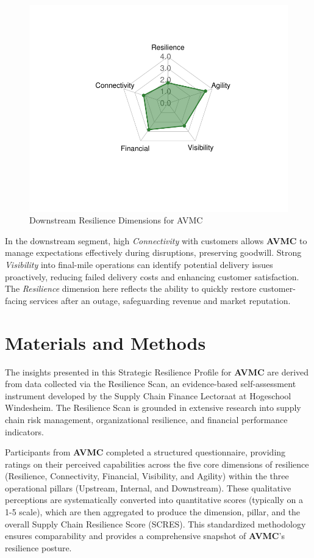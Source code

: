 \documentclass[
  oneside,
  open=any,
  fontsize=11pt]{scrbook}
\begin{document}
\begin{figure}[H]

{\centering \includegraphics[width=0.8\linewidth,height=\textheight,keepaspectratio]{example_3_files/figure-pdf/downstream-radar-chart-1.pdf}

}

\caption{Downstream Resilience Dimensions for AVMC}

\end{figure}%

In the downstream segment, high \emph{Connectivity} with customers
allows \textbf{AVMC} to manage expectations effectively during
disruptions, preserving goodwill. Strong \emph{Visibility} into
final-mile operations can identify potential delivery issues
proactively, reducing failed delivery costs and enhancing customer
satisfaction. The \emph{Resilience} dimension here reflects the ability
to quickly restore customer-facing services after an outage,
safeguarding revenue and market reputation.

\chapter{Materials and Methods}\label{materials-and-methods}

The insights presented in this Strategic Resilience Profile for
\textbf{AVMC} are derived from data collected via the Resilience Scan,
an evidence-based self-assessment instrument developed by the Supply
Chain Finance Lectoraat at Hogeschool Windesheim. The Resilience Scan is
grounded in extensive research into supply chain risk management,
organizational resilience, and financial performance indicators.

Participants from \textbf{AVMC} completed a structured questionnaire,
providing ratings on their perceived capabilities across the five core
dimensions of resilience (Resilience, Connectivity, Financial,
Visibility, and Agility) within the three operational pillars (Upstream,
Internal, and Downstream). These qualitative perceptions are
systematically converted into quantitative scores (typically on a 1-5
scale), which are then aggregated to produce the dimension, pillar, and
the overall Supply Chain Resilience Score (SCRES). This standardized
methodology ensures comparability and provides a comprehensive snapshot
of \textbf{AVMC}'s resilience posture.
\end{document}
